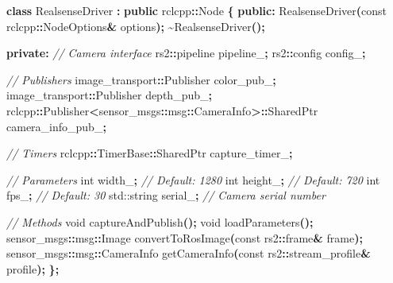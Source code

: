 \documentclass[
]{article}
\newenvironment{Shaded}{\begin{snugshade}}{\end{snugshade}}
\newcommand{\AttributeTok}[1]{\textcolor[rgb]{0.13,0.29,0.53}{#1}}
\newcommand{\BuiltInTok}[1]{#1}
\newcommand{\CommentTok}[1]{\textcolor[rgb]{0.56,0.35,0.01}{\textit{#1}}}
\newcommand{\DataTypeTok}[1]{\textcolor[rgb]{0.13,0.29,0.53}{#1}}
\newcommand{\KeywordTok}[1]{\textcolor[rgb]{0.13,0.29,0.53}{\textbf{#1}}}
\newcommand{\NormalTok}[1]{#1}
\newcommand{\OperatorTok}[1]{\textcolor[rgb]{0.81,0.36,0.00}{\textbf{#1}}}
\newcommand{\VariableTok}[1]{\textcolor[rgb]{0.00,0.00,0.00}{#1}}
\begin{document}
\begin{Shaded}
\begin{Highlighting}[]
\KeywordTok{class}\NormalTok{ RealsenseDriver }\OperatorTok{:} \KeywordTok{public}\NormalTok{ rclcpp}\OperatorTok{::}\NormalTok{Node }\OperatorTok{\{}
\KeywordTok{public}\OperatorTok{:}
\NormalTok{    RealsenseDriver}\OperatorTok{(}\AttributeTok{const}\NormalTok{ rclcpp}\OperatorTok{::}\NormalTok{NodeOptions}\OperatorTok{\&}\NormalTok{ options}\OperatorTok{);}
    \OperatorTok{\textasciitilde{}}\NormalTok{RealsenseDriver}\OperatorTok{();}

\KeywordTok{private}\OperatorTok{:}
    \CommentTok{// Camera interface}
\NormalTok{    rs2}\OperatorTok{::}\NormalTok{pipeline }\VariableTok{pipeline\_}\OperatorTok{;}
\NormalTok{    rs2}\OperatorTok{::}\NormalTok{config }\VariableTok{config\_}\OperatorTok{;}

    \CommentTok{// Publishers}
\NormalTok{    image\_transport}\OperatorTok{::}\NormalTok{Publisher }\VariableTok{color\_pub\_}\OperatorTok{;}
\NormalTok{    image\_transport}\OperatorTok{::}\NormalTok{Publisher }\VariableTok{depth\_pub\_}\OperatorTok{;}
\NormalTok{    rclcpp}\OperatorTok{::}\NormalTok{Publisher}\OperatorTok{\textless{}}\NormalTok{sensor\_msgs}\OperatorTok{::}\NormalTok{msg}\OperatorTok{::}\NormalTok{CameraInfo}\OperatorTok{\textgreater{}::}\NormalTok{SharedPtr }\VariableTok{camera\_info\_pub\_}\OperatorTok{;}

    \CommentTok{// Timers}
\NormalTok{    rclcpp}\OperatorTok{::}\NormalTok{TimerBase}\OperatorTok{::}\NormalTok{SharedPtr }\VariableTok{capture\_timer\_}\OperatorTok{;}

    \CommentTok{// Parameters}
    \DataTypeTok{int} \VariableTok{width\_}\OperatorTok{;}          \CommentTok{// Default: 1280}
    \DataTypeTok{int} \VariableTok{height\_}\OperatorTok{;}         \CommentTok{// Default: 720}
    \DataTypeTok{int} \VariableTok{fps\_}\OperatorTok{;}            \CommentTok{// Default: 30}
    \BuiltInTok{std::}\NormalTok{string }\VariableTok{serial\_}\OperatorTok{;} \CommentTok{// Camera serial number}

    \CommentTok{// Methods}
    \DataTypeTok{void}\NormalTok{ captureAndPublish}\OperatorTok{();}
    \DataTypeTok{void}\NormalTok{ loadParameters}\OperatorTok{();}
\NormalTok{    sensor\_msgs}\OperatorTok{::}\NormalTok{msg}\OperatorTok{::}\NormalTok{Image convertToRosImage}\OperatorTok{(}\AttributeTok{const}\NormalTok{ rs2}\OperatorTok{::}\NormalTok{frame}\OperatorTok{\&}\NormalTok{ frame}\OperatorTok{);}
\NormalTok{    sensor\_msgs}\OperatorTok{::}\NormalTok{msg}\OperatorTok{::}\NormalTok{CameraInfo getCameraInfo}\OperatorTok{(}\AttributeTok{const}\NormalTok{ rs2}\OperatorTok{::}\NormalTok{stream\_profile}\OperatorTok{\&}\NormalTok{ profile}\OperatorTok{);}
\OperatorTok{\};}
\end{Highlighting}
\end{Shaded}
\end{document}

